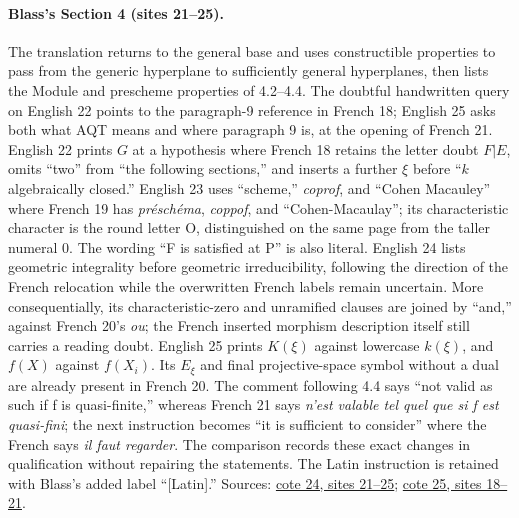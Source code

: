 \paragraph{Blass's Section 4 (sites 21--25).}
The translation returns to the general base and uses constructible properties to pass from the generic hyperplane to sufficiently general hyperplanes, then lists the Module and prescheme properties of 4.2--4.4. The doubtful handwritten query on English 22 points to the paragraph-9 reference in French 18; English 25 asks both what AQT means and where paragraph 9 is, at the opening of French 21. English 22 prints $G$ at a hypothesis where French 18 retains the letter doubt $F|E$, omits ``two'' from ``the following sections,'' and inserts a further $\xi$ before ``$k$ algebraically closed.'' English 23 uses ``scheme,'' \emph{coprof}, and ``Cohen Macauley'' where French 19 has \emph{préschéma}, \emph{coppof}, and ``Cohen-Macaulay''; its characteristic character is the round letter O, distinguished on the same page from the taller numeral 0. The wording ``F is satisfied at P'' is also literal. English 24 lists geometric integrality before geometric irreducibility, following the direction of the French relocation while the overwritten French labels remain uncertain. More consequentially, its characteristic-zero and unramified clauses are joined by ``and,'' against French 20's \emph{ou}; the French inserted morphism description itself still carries a reading doubt. English 25 prints $K(\xi)$ against lowercase $k(\xi)$, and $f(X)$ against $f(X_i)$. Its $E_\xi$ and final projective-space symbol without a dual are already present in French 20. The comment following 4.4 says ``not valid as such if f is quasi-finite,'' whereas French 21 says \emph{n'est valable tel quel que si f est quasi-fini}; the next instruction becomes ``it is sufficient to consider'' where the French says \emph{il faut regarder}. The comparison records these exact changes in qualification without repairing the statements. The Latin instruction is retained with Blass's added label ``[Latin].'' Sources: \href{https://grothendieck.umontpellier.fr/web/viewer.html?file=../24.pdf\#page=22}{cote 24, sites 21--25}; \href{https://grothendieck.umontpellier.fr/web/viewer.html?file=../25.pdf\#page=19}{cote 25, sites 18--21}.

